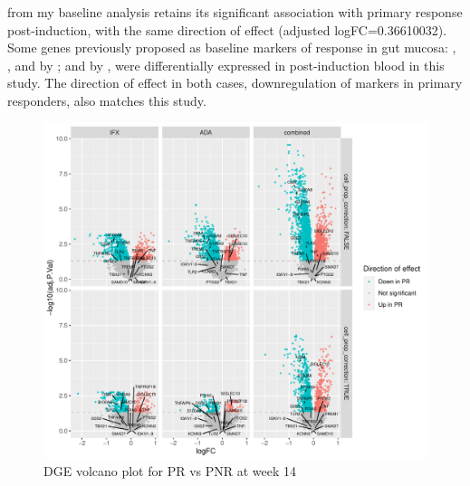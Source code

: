 \begin{outline}
 from my baseline analysis retains its significant association with primary response post-induction, with the same direction of effect (adjusted logFC=\num{0.36610032}).
Some genes previously proposed as baseline markers of response in gut mucosa: , ,  and  by \autocite{arijs2010PredictiveValueEpithelial}; and  by \autocite{west2017OncostatinDrivesIntestinal},
were differentially expressed in post-induction blood in this study.
The direction of effect in both cases, downregulation of markers in primary responders, also matches this study.

\begin{figure}
    \centering
    \includegraphics[width=1.0\textwidth,page=1]{mainmatter/figures/chapter_04/plot_gene_set_enrichment.dge_result_volcano_simple_C_3RI_3NI,C_3RA_3NA,C_3R_3N.pdf}
    \caption{DGE volcano plot for PR vs PNR at week 14}
    \label{fig:multipants_dge_volcano_week_14_R_N}
\end{figure}


\end{outline}
